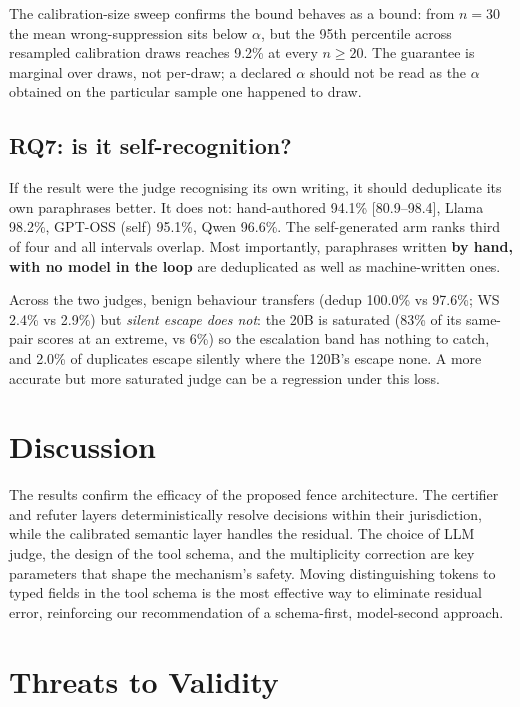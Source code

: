 \documentclass[10pt,twocolumn]{article}
\theoremstyle{definition}
\theoremstyle{remark}
\begin{document}
The calibration-size sweep confirms the bound behaves as a bound: from $n{=}30$
the mean wrong-suppression sits below $\alpha$, but the 95th percentile across
resampled calibration draws reaches 9.2\% at every $n \geq 20$. The guarantee is
marginal over draws, not per-draw; a declared $\alpha$ should not be read as the
$\alpha$ obtained on the particular sample one happened to draw.

\subsection{RQ7: is it self-recognition?}

If the result were the judge recognising its own writing, it should deduplicate
its own paraphrases better. It does not: hand-authored 94.1\% [80.9--98.4],
Llama 98.2\%, GPT-OSS (self) 95.1\%, Qwen 96.6\%. The self-generated arm ranks
third of four and all intervals overlap. Most importantly, paraphrases written
\textbf{by hand, with no model in the loop} are deduplicated as well as
machine-written ones.

Across the two judges, benign behaviour transfers (dedup 100.0\% vs 97.6\%; WS
2.4\% vs 2.9\%) but \emph{silent escape does not}: the 20B is saturated (83\% of
its same-pair scores at an extreme, vs 6\%) so the escalation band has nothing to
catch, and 2.0\% of duplicates escape silently where the 120B's escape none. A
more accurate but more saturated judge can be a regression under this loss.

\section{Discussion}

The results confirm the efficacy of the proposed fence architecture. The certifier and refuter layers deterministically resolve decisions within their jurisdiction, while the calibrated semantic layer handles the residual. The choice of LLM judge, the design of the tool schema, and the multiplicity correction are key parameters that shape the mechanism's safety. Moving distinguishing tokens to typed fields in the tool schema is the most effective way to eliminate residual error, reinforcing our recommendation of a schema-first, model-second approach.

\section{Threats to Validity}
\end{document}
